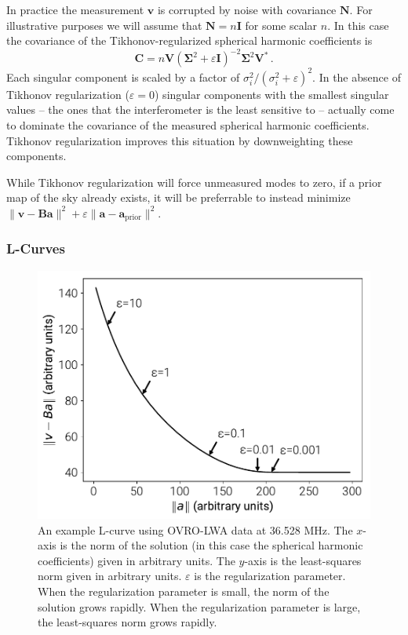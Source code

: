 \documentclass[twocolumn]{aastex61}
\renewcommand{\b}{\pmb}
\begin{document}
In practice the measurement $\b v$ is corrupted by noise with covariance $\b N$. For illustrative
purposes we will assume that $\b N=n\b I$ for some scalar $n$. In this case the covariance of the
Tikhonov-regularized spherical harmonic coefficients is
\begin{equation}
    \b C = n \b V (\b\Sigma^2 + \varepsilon\b I)^{-2} \b\Sigma^2 \b V^*\,.
\end{equation}
Each singular component is scaled by a factor of $\sigma_i^2/(\sigma_i^2 + \varepsilon)^2$.  In the
absence of Tikhonov regularization ($\varepsilon=0$) singular components with the smallest singular
values -- the ones that the interferometer is the least sensitive to -- actually come to dominate
the covariance of the measured spherical harmonic coefficients. Tikhonov regularization improves
this situation by downweighting these components.

While Tikhonov regularization will force unmeasured modes to zero, if a prior map of the sky already
exists, it will be preferrable to instead minimize $\|\b v - \b B\b a\|^2 + \varepsilon \|\b a-\b
a_\text{prior}\|^2$.

\subsubsection{L-Curves}

\begin{figure}[t]
    \includegraphics[width=\columnwidth]{figures/lcurve/lcurve}
    \caption{
        An example L-curve using OVRO-LWA data at 36.528 MHz. The $x$-axis is the norm of the
        solution (in this case the spherical harmonic coefficients) given in arbitrary units. The
        $y$-axis is the least-squares norm given in arbitrary units. $\varepsilon$ is the
        regularization parameter. When the regularization parameter is small, the norm of the
        solution grows rapidly. When the regularization parameter is large, the least-squares norm
        grows rapidly.
    }
    \label{fig:lcurve}
\end{figure}
\end{document}
